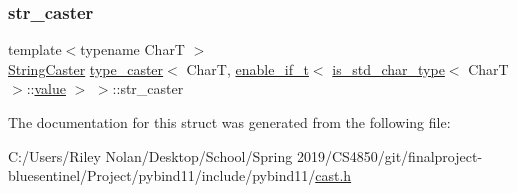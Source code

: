 \mbox{\label{structtype__caster_3_01_char_t_00_01enable__if__t_3_01is__std__char__type_3_01_char_t_01_4_1_1value_01_4_01_4_a038aec9c5330b12a30e091c875dc9dc1}} 
\subsubsection{\texorpdfstring{str\_caster}{str\_caster}}
{\footnotesize\ttfamily template$<$typename CharT $>$ \\
\mbox{\hyperlink{structtype__caster_3_01_char_t_00_01enable__if__t_3_01is__std__char__type_3_01_char_t_01_4_1_1value_01_4_01_4_a10a64e7a7ab17aff6f024a8476cc22cc}{String\+Caster}} \mbox{\hyperlink{classtype__caster}{type\+\_\+caster}}$<$ CharT, \mbox{\hyperlink{detail_2common_8h_a012819c9e8b5e04872a271f50f8b8196}{enable\+\_\+if\+\_\+t}}$<$ \mbox{\hyperlink{cast_8h_a0ee0eaf3d12f9b0e472ed620777ba3c3}{is\+\_\+std\+\_\+char\+\_\+type}}$<$ CharT $>$\+::\mbox{\hyperlink{_s_d_l__opengl__glext_8h_a8ad81492d410ff2ac11f754f4042150f}{value}} $>$ $>$\+::str\+\_\+caster}



The documentation for this struct was generated from the following file\+:\begin{DoxyCompactItemize}
\item 
C\+:/\+Users/\+Riley Nolan/\+Desktop/\+School/\+Spring 2019/\+C\+S4850/git/finalproject-\/bluesentinel/\+Project/pybind11/include/pybind11/\mbox{\hyperlink{cast_8h}{cast.\+h}}\end{DoxyCompactItemize}
